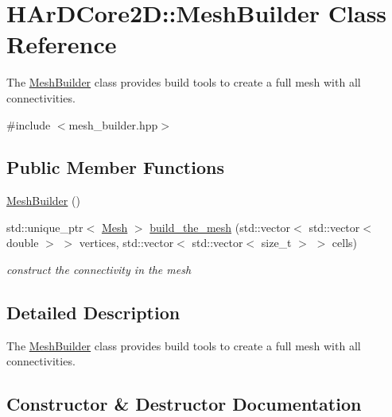 \hypertarget{classHArDCore2D_1_1MeshBuilder}{}\section{H\+Ar\+D\+Core2D\+:\+:Mesh\+Builder Class Reference}
\label{classHArDCore2D_1_1MeshBuilder}


The \hyperlink{classHArDCore2D_1_1MeshBuilder}{Mesh\+Builder} class provides build tools to create a full mesh with all connectivities.  




{\ttfamily \#include $<$mesh\+\_\+builder.\+hpp$>$}

\subsection*{Public Member Functions}
\begin{DoxyCompactItemize}
\item 
\hyperlink{classHArDCore2D_1_1MeshBuilder_a13fe22fd14a85f789dc9d7d4a8d2419d}{Mesh\+Builder} ()
\item 
std\+::unique\+\_\+ptr$<$ \hyperlink{classHArDCore2D_1_1Mesh}{Mesh} $>$ \hyperlink{classHArDCore2D_1_1MeshBuilder_a0ef4a78ac64d1bcb6380317ea866758d}{build\+\_\+the\+\_\+mesh} (std\+::vector$<$ std\+::vector$<$ double $>$ $>$ vertices, std\+::vector$<$ std\+::vector$<$ size\+\_\+t $>$ $>$ cells)
\begin{DoxyCompactList}\small\item\em construct the connectivity in the mesh \end{DoxyCompactList}\end{DoxyCompactItemize}


\subsection{Detailed Description}
The \hyperlink{classHArDCore2D_1_1MeshBuilder}{Mesh\+Builder} class provides build tools to create a full mesh with all connectivities. 

\subsection{Constructor \& Destructor Documentation}
\mbox{\label{classHArDCore2D_1_1MeshBuilder_a13fe22fd14a85f789dc9d7d4a8d2419d}} 
